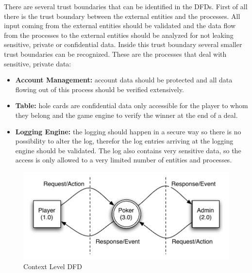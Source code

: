 \documentclass[a4paper,11pt]{report}
\begin{document}
There are several trust boundaries that can be identified in the DFDs. First of all there is the trust boundary between the external entities and the processes. All input coming from the external entities should be validated and the data flow from the processes to the external entities should be analyzed for not leaking sensitive, private or confidential data. Inside this trust boundary several smaller trust boundaries can be recognized. These are the processes that deal with sensitive, private data: 
\begin{itemize}
\item \textbf{Account Management:} account data should be protected and all data flowing out of this process should be verified extensively. 
\item \textbf{Table:} hole cards are confidential data only accessible for the player to whom they belong and the game engine to verify the winner at the end of a deal.
\item \textbf{Logging Engine:} the logging should happen in a secure way so there is no possibility to alter the log, therefor the log entries arriving at the logging engine should be validated. The log also contains very sensitive data, so the access is only allowed to a very limited number of entities and processes.
\end{itemize}
 

\begin{figure}[h]
  \begin{center}
    \includegraphics[scale=0.8]{context_diagram}
  \end{center}
  \caption{Context Level DFD}\label{fig:context}
\end{figure}
\end{document}
